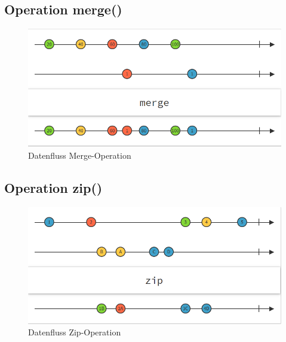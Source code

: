 \subsection{Operation merge()}
\begin{figure}
	\centering
	\includegraphics[width=1\textwidth]{Abb/merge}
	\caption{Datenfluss Merge-Operation}
	\label{pic:merge}
\end{figure}
\subsection{Operation zip()}
\begin{figure}
	\centering
	\includegraphics[width=1\textwidth]{Abb/zip}
	\caption{Datenfluss Zip-Operation}
	\label{pic:zip}
\end{figure}


